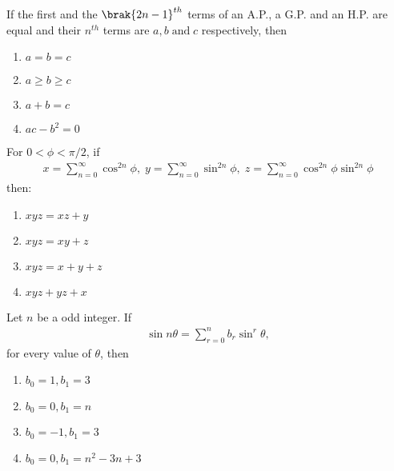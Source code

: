 \iffalse
\title{Sequence and Series}
\author{DHAWAL-ee24btech11015}
\section{mcq-multiple}
\fi

	\item If the first and the $\brak{2n-1}^{th}$ terms of an A.P., a G.P. and an H.P. are equal and their $n^{th}$ terms are $a, b \; \text{and} \; c$ respectively, then \hfill{}

\begin{multicols}{4}
\begin{enumerate}
\item $a=b=c$
\item $a \geq b \geq c$
\item $a+b=c$
\item $ac-b^2=0$
\end{enumerate}
\end{multicols}

\item For $0 < \phi < \pi /2$, if 
\begin{align*}
x=\sum_{n=0}^{\infty} \cos^{2n} \phi , \;
y=\sum_{n=0}^{\infty} \sin^{2n} \phi , \;
z=\sum_{n=0}^{\infty} \cos^{2n} \phi \sin^{2n} \phi
\end{align*}
then: \hfill{}
\begin{multicols}{4}
\begin{enumerate}
\item $xyz=xz+y$
\item $xyz=xy+z$
\item $xyz=x+y+z$
\item $xyz+yz+x$
\end{enumerate}
\end{multicols}

\item Let $n$ be a odd integer. If 
\begin{align*}
\sin n\theta= \sum_{r=0}^{n} b_r \sin^{r} \theta, 
\end{align*}
for every value of $\theta$, then
\hfill{}
\begin{multicols}{2}
\begin{enumerate}
\item $b_0=1, b_1=3$
\item $b_0=0, b_1=n$
\item $b_0=-1, b_1=3$
\item $b_0=0, b_1=n^2-3n+3$
\end{enumerate}
\end{multicols}

